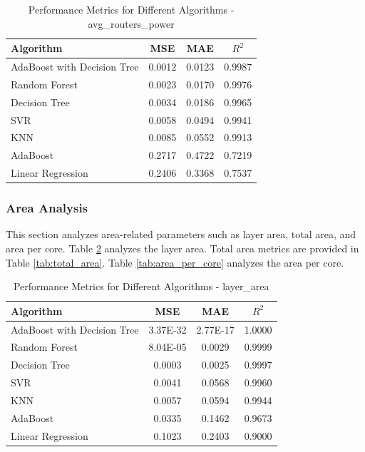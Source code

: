 \documentclass[conference]{IEEEtran}
\begin{document}
\begin{table}[htbp]
	\caption{Performance Metrics for Different Algorithms - avg\_routers\_power}
	\label{tab:avg_routers_power}
	\begin{tabular}{lccc}
		\toprule
		\textbf{Algorithm} & \textbf{MSE} & \textbf{MAE} & \textbf{\(R^2\)} \\
		\midrule
		AdaBoost with Decision Tree & 0.0012 & 0.0123 & 0.9987 \\
		Random Forest & 0.0023 & 0.0170 & 0.9976 \\
		Decision Tree & 0.0034 & 0.0186 & 0.9965 \\
		SVR & 0.0058 & 0.0494 & 0.9941 \\
		KNN & 0.0085 & 0.0552 & 0.9913 \\
		AdaBoost & 0.2717 & 0.4722 & 0.7219 \\
		Linear Regression & 0.2406 & 0.3368 & 0.7537 \\
		\bottomrule
	\end{tabular}
\end{table}



	\subsubsection{Area Analysis}
	This section analyzes area-related parameters such as layer area, total area, and area per core. Table \ref{tab:layer_area} analyzes the layer area. Total area metrics are provided in Table \ref{tab:total_area}. Table \ref{tab:area_per_core} analyzes the area per core.

\begin{table}[htbp]
	\caption{Performance Metrics for Different Algorithms - layer\_area}
	\label{tab:layer_area}
	\begin{tabular}{lccc}
		\toprule
		\textbf{Algorithm} & \textbf{MSE} & \textbf{MAE} & \textbf{\(R^2\)} \\
		\midrule
		AdaBoost with Decision Tree & 3.37E-32 & 2.77E-17 & 1.0000 \\
		Random Forest & 8.04E-05 & 0.0029 & 0.9999 \\
		Decision Tree & 0.0003 & 0.0025 & 0.9997 \\
		SVR & 0.0041 & 0.0568 & 0.9960 \\
		KNN & 0.0057 & 0.0594 & 0.9944 \\
		AdaBoost & 0.0335 & 0.1462 & 0.9673 \\
		Linear Regression & 0.1023 & 0.2403 & 0.9000 \\
		\bottomrule
	\end{tabular}
\end{table}
\end{document}
